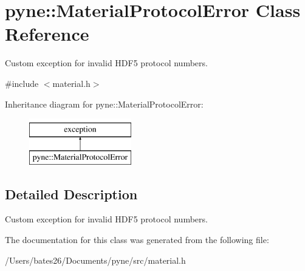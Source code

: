 \hypertarget{classpyne_1_1_material_protocol_error}{\section{pyne\+:\+:Material\+Protocol\+Error Class Reference}
\label{classpyne_1_1_material_protocol_error}
}


Custom exception for invalid H\+D\+F5 protocol numbers.  




{\ttfamily \#include $<$material.\+h$>$}

Inheritance diagram for pyne\+:\+:Material\+Protocol\+Error\+:\begin{figure}[H]
\begin{center}
\leavevmode
\includegraphics[height=2.000000cm]{classpyne_1_1_material_protocol_error}
\end{center}
\end{figure}


\subsection{Detailed Description}
Custom exception for invalid H\+D\+F5 protocol numbers. 

The documentation for this class was generated from the following file\+:\begin{DoxyCompactItemize}
\item 
/\+Users/bates26/\+Documents/pyne/src/material.\+h\end{DoxyCompactItemize}
